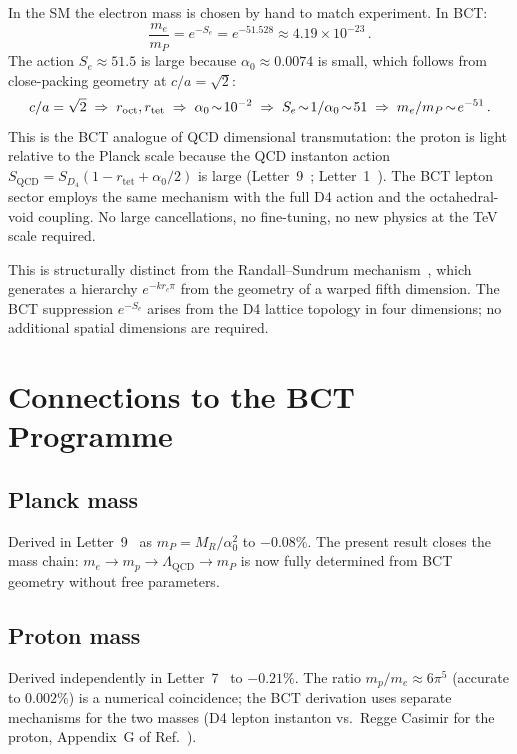 \documentclass[twocolumn,10pt,a4paper]{article}
\begin{document}
In the SM the electron mass is chosen by hand to match experiment. In BCT:
\begin{equation}
  \frac{m_e}{m_P} = e^{-S_e} = e^{-51.528} \approx 4.19\times10^{-23}\,.
  \label{eq:hierarchy}
\end{equation}
The action $S_e\approx51.5$ is large because $\alpha_0\approx0.0074$ is
small, which follows from close-packing geometry at $c/a=\sqrt{2}$:
\begin{equation*}
  c/a = \sqrt{2}
  \;\Rightarrow\; r_{\rm oct},r_{\rm tet}
  \;\Rightarrow\; \alpha_0\!\sim\!10^{-2}
  \;\Rightarrow\; S_e\!\sim\!1/\alpha_0\!\sim\!51
  \;\Rightarrow\; m_e/m_P\!\sim\!e^{-51}\,.
\end{equation*}
This is the BCT analogue of QCD dimensional transmutation: the proton is
light relative to the Planck scale because the QCD instanton action
$S_\mathrm{QCD} = S_{D_4}(1-r_\mathrm{tet}+\alpha_0/2)$ is large
(Letter~9~\cite{planck}; Letter~1~\cite{lorentz}). The BCT lepton sector
employs the same mechanism with the full D4 action and the octahedral-void
coupling. No large cancellations, no fine-tuning, no new physics at the TeV
scale required.

This is structurally distinct from the Randall--Sundrum
mechanism~\cite{rs}, which generates a hierarchy $e^{-kr_c\pi}$ from the
geometry of a warped fifth dimension. The BCT suppression $e^{-S_e}$ arises
from the D4 lattice topology in four dimensions; no additional spatial
dimensions are required.

\section*{Connections to the BCT Programme}

\subsection*{Planck mass} Derived in Letter~9~\cite{planck} as
$m_P = M_R/\alpha_0^2$ to $-0.08\%$.  The present result closes the mass
chain: $m_e \to m_p \to \Lambda_\mathrm{QCD} \to m_P$ is now fully
determined from BCT geometry without free parameters.

\subsection*{Proton mass} Derived independently in Letter~7~\cite{baryons}
to $-0.21\%$.  The ratio $m_p/m_e\approx6\pi^5$ (accurate to $0.002\%$) is
a numerical coincidence; the BCT derivation uses separate mechanisms for the
two masses (D4 lepton instanton vs.\ Regge Casimir for the proton,
Appendix~G of Ref.~\cite{monograph}).
\end{document}
